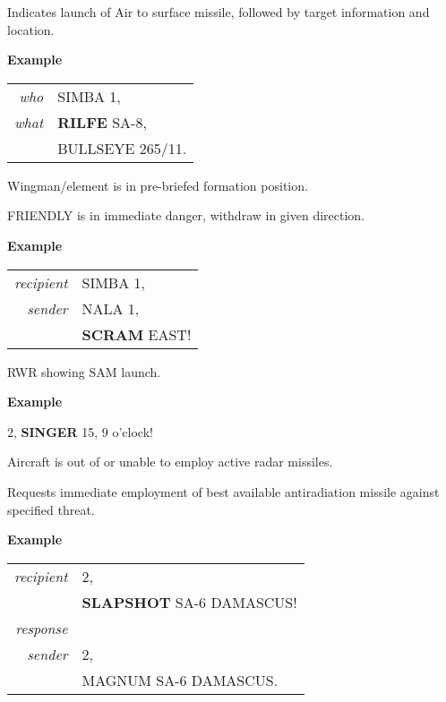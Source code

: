 \begin{tcoloritemize}
    \blueitem[RIFLE]
    Indicates launch of Air to surface missile,
    followed by target information and location.

    \medskip
    \textbf{Example}
    \begin{center}
        \begin{tabular}{>{\itshape}r l}
            who &   SIMBA 1, \\
            what & \textbf{RILFE} SA-8, \\
            & BULLSEYE 265/11. \\
        \end{tabular}
    \end{center}

    \blueitem[SADDLED]
    Wingman/element is in pre-briefed formation position.

    \blueitem[SCRAM]
    FRIENDLY is in immediate danger, withdraw in given direction.

    \medskip
    \textbf{Example}
    \begin{center}
        \begin{tabular}{>{\itshape}r l}
            recipient &   SIMBA 1, \\
            sender & NALA 1, \\
            & \textbf{SCRAM} EAST! \\
        \end{tabular}
    \end{center}

    \blueitem[SINGER]
    RWR showing SAM launch.

    \medskip
    \textbf{Example}
    \begin{center}
        \begin{minipage}{0.9\textwidth}
            2, \textbf{SINGER} 15, 9 o'clock!
        \end{minipage}
    \end{center}

    \blueitem[SKOSH]
    Aircraft is out of or unable to employ active radar missiles.

    \blueitem[SLAPSHOT]
    Requests immediate employment of best available antiradiation missile against specified threat.
    
    \medskip
    \textbf{Example}
    \begin{center}
        \begin{tabular}{>{\itshape}r l}
            recipient &  2, \\
            & \textbf{SLAPSHOT} SA-6 DAMASCUS! \\
            response \\
            sender & 2, \\
            & MAGNUM SA-6 DAMASCUS. \\
        \end{tabular}
    \end{center}


\end{tcoloritemize}
